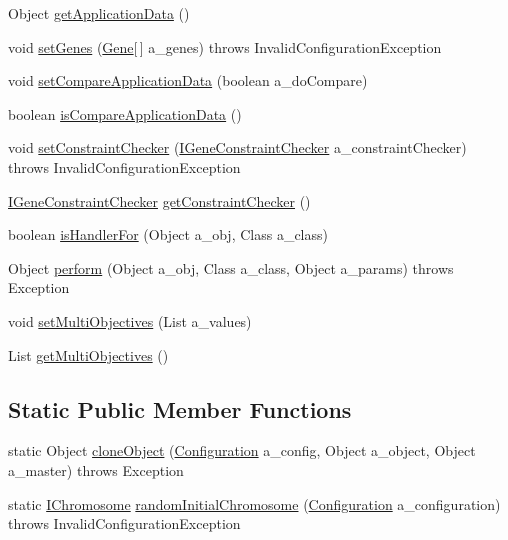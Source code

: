 \begin{DoxyCompactItemize}
\item 
Object \hyperlink{classorg_1_1jgap_1_1_chromosome_aae49bf34668621de1d691cd759ff50b9}{get\-Application\-Data} ()
\item 
void \hyperlink{classorg_1_1jgap_1_1_chromosome_a96692e7942a035e9b661360ca758c7cb}{set\-Genes} (\hyperlink{interfaceorg_1_1jgap_1_1_gene}{Gene}\mbox{[}$\,$\mbox{]} a\-\_\-genes)  throws Invalid\-Configuration\-Exception 
\item 
void \hyperlink{classorg_1_1jgap_1_1_chromosome_aa82fc94cbbfeb5b6b5b89a97f9089e9e}{set\-Compare\-Application\-Data} (boolean a\-\_\-do\-Compare)
\item 
boolean \hyperlink{classorg_1_1jgap_1_1_chromosome_a284d75bb2919718325b376e2c91870d0}{is\-Compare\-Application\-Data} ()
\item 
void \hyperlink{classorg_1_1jgap_1_1_chromosome_ae99251567d68bd079e8c4dfaf15dc513}{set\-Constraint\-Checker} (\hyperlink{interfaceorg_1_1jgap_1_1_i_gene_constraint_checker}{I\-Gene\-Constraint\-Checker} a\-\_\-constraint\-Checker)  throws Invalid\-Configuration\-Exception 
\item 
\hyperlink{interfaceorg_1_1jgap_1_1_i_gene_constraint_checker}{I\-Gene\-Constraint\-Checker} \hyperlink{classorg_1_1jgap_1_1_chromosome_a6c56caed7a052c678daa6af668cad388}{get\-Constraint\-Checker} ()
\item 
boolean \hyperlink{classorg_1_1jgap_1_1_chromosome_a45bc47533c183ecf3297d7507299cc85}{is\-Handler\-For} (Object a\-\_\-obj, Class a\-\_\-class)
\item 
Object \hyperlink{classorg_1_1jgap_1_1_chromosome_abee38007a07ba7a1442dd96571ed7cc1}{perform} (Object a\-\_\-obj, Class a\-\_\-class, Object a\-\_\-params)  throws Exception 
\item 
void \hyperlink{classorg_1_1jgap_1_1_chromosome_aaeae2078063f38074853b06d5c913fa6}{set\-Multi\-Objectives} (List a\-\_\-values)
\item 
List \hyperlink{classorg_1_1jgap_1_1_chromosome_a6129d035292cd1d271b5ef5dbc3e3161}{get\-Multi\-Objectives} ()
\end{DoxyCompactItemize}
\subsection*{Static Public Member Functions}
\begin{DoxyCompactItemize}
\item 
static Object \hyperlink{classorg_1_1jgap_1_1_chromosome_ab77c73b07816a5f3b99a3459fbe0208c}{clone\-Object} (\hyperlink{classorg_1_1jgap_1_1_configuration}{Configuration} a\-\_\-config, Object a\-\_\-object, Object a\-\_\-master)  throws Exception 
\item 
static \hyperlink{interfaceorg_1_1jgap_1_1_i_chromosome}{I\-Chromosome} \hyperlink{classorg_1_1jgap_1_1_chromosome_a6b6fb5c7c5b532813a4661de5dbd9ab3}{random\-Initial\-Chromosome} (\hyperlink{classorg_1_1jgap_1_1_configuration}{Configuration} a\-\_\-configuration)  throws Invalid\-Configuration\-Exception 
\end{DoxyCompactItemize}
